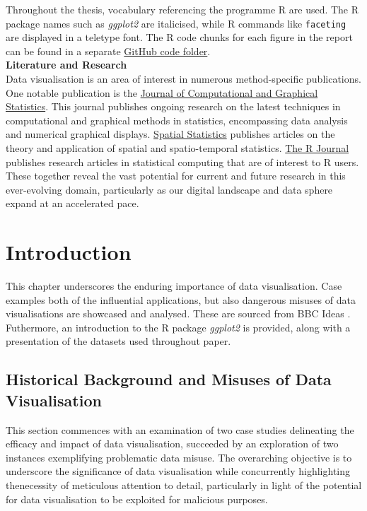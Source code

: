 \documentclass{article}\usepackage[]{graphicx}\usepackage[]{xcolor}
\numberwithin{equation}{section}
\begin{document}
\noindent
Throughout the thesis, vocabulary referencing the programme R are used. The R package names such as \textit{ggplot2} are italicised, while R commands like \texttt{faceting} are displayed in a teletype font. The R code chunks for each figure in the report can be found in a separate \href{https://github.com/Qinqing-Li/Data-Visualisation-Project/tree/main/code}{GitHub code folder}. \\

\noindent \textbf{Literature and Research}\\ 
\noindent
Data visualisation is an area of interest in numerous method-specific publications. One notable publication is the \href{https://www.tandfonline.com/journals/ucgs20}{Journal of Computational and Graphical Statistics}. This journal publishes ongoing research on the latest techniques in computational and graphical methods in statistics, encompassing data analysis and numerical graphical displays. \href{https://www.sciencedirect.com/journal/spatial-statistics}{Spatial Statistics} publishes articles on the theory and application of spatial and spatio-temporal statistics. \href{https://journal.r-project.org}{The R Journal} publishes research articles in statistical computing that are of interest to R users. These together reveal the vast potential for current and future research in this ever-evolving domain, particularly as our digital landscape and data sphere expand at an accelerated pace.\\

\newpage 

\section{Introduction}

\noindent
This chapter underscores the enduring importance of data visualisation. Case examples both of the influential applications, but also dangerous misuses of data visualisations are showcased and analysed. These are sourced from BBC Ideas \cite{bbcdatavis}. Futhermore, an introduction to the R package \textit{ggplot2} is provided, along with a presentation of the datasets used throughout paper. 

\subsection{Historical Background and Misuses of Data Visualisation}

\noindent This section commences with an examination of two case studies delineating the efficacy and impact of data visualisation, succeeded by an exploration of two instances exemplifying problematic data misuse. The overarching objective is to underscore the significance of data visualisation while concurrently highlighting thenecessity of meticulous attention to detail, particularly in light of the potential for data visualisation to be exploited for malicious purposes.\\
 
\end{document}
